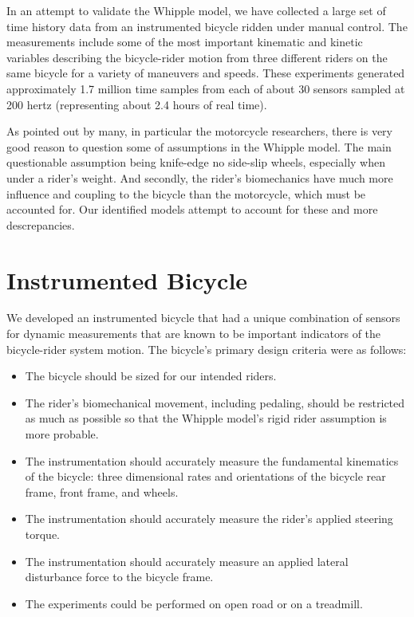 \documentclass[a4paper]{article}
\begin{document}
In an attempt to validate the Whipple model, we have collected a large set of
time history data from an instrumented bicycle ridden under manual control. The
measurements include some of the most important kinematic and kinetic variables
describing the bicycle-rider motion from three different riders on the same
bicycle for a variety of maneuvers and speeds. These experiments generated
approximately 1.7 million time samples from each of about 30 sensors sampled at
200 hertz (representing about 2.4 hours of real time).

As pointed out by many, in particular the motorcycle researchers, there is very
good reason to question some of assumptions in the Whipple model. The main
questionable assumption being knife-edge no side-slip wheels, especially when
under a rider's weight. And secondly, the rider's biomechanics have much more
influence and coupling to the bicycle than the motorcycle, which must be
accounted for. Our identified models attempt to account for these and more
descrepancies.

\section{Instrumented Bicycle}

We developed an instrumented bicycle that had a unique combination of sensors
for dynamic measurements that are known to be important indicators of the
bicycle-rider system motion. The bicycle's primary design criteria were as
follows:

\begin{itemize}
  \item The bicycle should be sized for our intended riders.
  \item The rider's biomechanical movement, including pedaling, should be
    restricted as much as possible so that the Whipple model's rigid rider
    assumption is more probable.
  \item The instrumentation should accurately measure the fundamental
    kinematics of the bicycle: three dimensional rates and orientations of the
    bicycle rear frame, front frame, and wheels.
  \item The instrumentation should accurately measure the rider's applied
    steering torque.
  \item The instrumentation should accurately measure an applied lateral
    disturbance force to the bicycle frame.
  \item The experiments could be performed on open road or on a treadmill.
\end{itemize}
\end{document}
